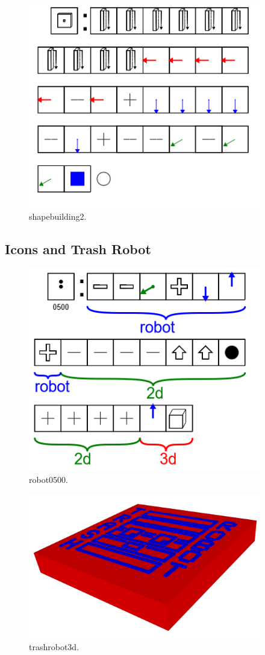 \begin{figure}
	\centering
	\includegraphics[width=4in]{figures/geometron3d/shapebuilding2.png}
	\caption[shapebuilding2]
	{shapebuilding2.}
\end{figure}

\subsection{Icons and Trash Robot}


\begin{figure}
	\centering
	\includegraphics[width=4in]{figures/geometron3d/robot0500.png}
	\caption[robot0500]
	{robot0500.}
\end{figure}

\begin{figure}
	\centering
	\includegraphics[width=4in]{figures/geometron3d/trashrobot3d.png}
	\caption[trashrobot3d]
	{trashrobot3d.}
\end{figure}

